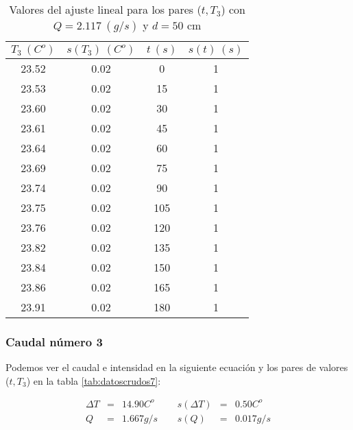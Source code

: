 \documentclass[12pt,a4paper]{article}
\begin{document}
 \begin{table}[h!] 	 \centering 
\begin{tabular}{|c|c|c|c|} 
\hline 
$T_3 \ (C^o)$ & $s(T_3) \ (C^o)$ & $ t \ (s)$ & $s(t) \ (s)$  \\ \hline 
23.52  & 0.02 &  0 & 1 \\ 
\hline
23.53  & 0.02 &  15 & 1 \\ 
\hline
23.60  & 0.02 &  30 & 1 \\ 
\hline
23.61  & 0.02 &  45 & 1 \\ 
\hline
23.64  & 0.02 &  60 & 1 \\ 
\hline
23.69  & 0.02 &  75 & 1 \\ 
\hline
23.74  & 0.02 &  90 & 1 \\ 
\hline
23.75  & 0.02 &  105 & 1 \\ 
\hline
23.76  & 0.02 &  120 & 1 \\ 
\hline
23.82  & 0.02 &  135 & 1 \\ 
\hline
23.84  & 0.02 &  150 & 1 \\ 
\hline
23.86  & 0.02 &  165 & 1 \\ 
\hline
23.91  & 0.02 &  180 & 1 \\ 
\hline
\end{tabular} 
\caption{Valores del ajuste lineal para los pares ($t,T_3$) con $Q=2.117 \ (g/s)$ y $d= 50 $ cm} 
\label{tab:datoscrudos6} 
\end{table} 
 
\newpage
 
\subsubsection{Caudal número 3} \label{subsec:8} 
 
Podemos ver el caudal e intensidad en la siguiente ecuación y los pares de valores ($t,T_3$) en la tabla \ref{tab:datoscrudos7}: 
 
\begin{equation} 
\begin{array}{lllllll}
\Delta T & = & 14.90 C^o &  \ \ &  s(\Delta T) & =  & 0.50  C^o \\ 
 Q & = & 1.667 g/s &  \ \ &  s(Q) & =  & 0.017  g/s \\ 
 \end{array} 
\end{equation} 
 
\end{document}
